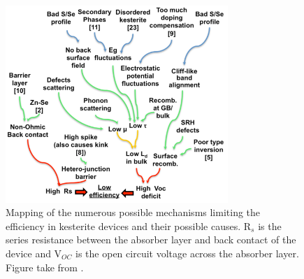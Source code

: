\begin{figure}[h!]
  \centering
    \includegraphics[width=0.75\textwidth]{figures/kesterite_bottlenecks.png}
    \caption{Mapping of the numerous possible mechanisms limiting the efficiency in kesterite devices and their possible causes. R$_s$ is the series resistance between the absorber layer and back contact of the device and V$_{OC}$ is the open circuit voltage across the absorber layer. Figure take from .}
  \label{kesterite_bottlenecks}
\end{figure}

